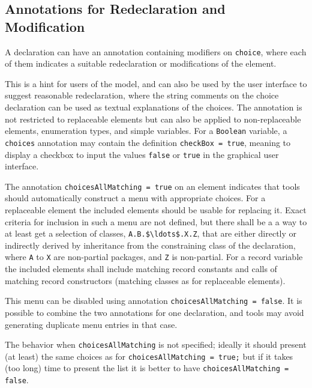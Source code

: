 \subsection{Annotations for Redeclaration and Modification}\label{annotation-choices-for-suggested-redeclarations-and-modifications}

A declaration can have an annotation  containing modifiers on \lstinline!choice!, where each of them indicates a suitable redeclaration or modifications of the element.

This is a hint for users of the model, and can also be used by the user interface to suggest reasonable redeclaration, where the string comments on the choice declaration can be used as textual explanations of the choices.
The annotation is not restricted to replaceable elements but can also be applied to non-replaceable elements, enumeration types, and simple variables.
For a \lstinline!Boolean! variable, a \lstinline!choices! annotation may contain the definition \lstinline!checkBox = true!, meaning to display a checkbox to input the values \lstinline!false! or \lstinline!true! in the graphical user interface.

The annotation \lstinline!choicesAllMatching = true! on an element indicates that tools should automatically construct a menu with appropriate choices.
For a replaceable element the included elements should be usable for replacing it.
Exact criteria for inclusion in such a menu are not defined, but there shall be a a way to at least get a selection of classes, \lstinline!A.B.$\ldots$.X.Z!, that are either directly or indirectly derived by inheritance from the constraining class of the declaration, where \lstinline!A! to \lstinline!X! are non-partial packages, and \lstinline!Z! is non-partial.
For a record variable the included elements shall include matching record constants and calls of matching record constructors (matching classes as for replaceable elements).

This menu can be disabled using annotation \lstinline!choicesAllMatching = false!.
It is possible to combine the two annotations for one declaration, and tools may avoid generating duplicate menu entries in that case.
\begin{nonnormative}
The behavior when \lstinline!choicesAllMatching! is not specified; ideally it should present (at least) the same choices as for \lstinline!choicesAllMatching = true;! but if it takes (too long) time to present the list it is better to have \lstinline!choicesAllMatching = false!.
\end{nonnormative}

